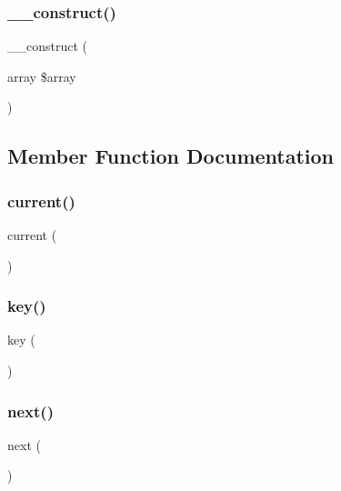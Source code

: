 \subsubsection{\texorpdfstring{\+\_\+\+\_\+construct()}{\_\_construct()}}
{\footnotesize\ttfamily \+\_\+\+\_\+construct (\begin{DoxyParamCaption}\item[{array}]{\$array }\end{DoxyParamCaption})}



\subsection{Member Function Documentation}
\mbox{\label{class_test_iterator2_af343507d1926e6ecf964625d41db528c}} 
\subsubsection{\texorpdfstring{current()}{current()}}
{\footnotesize\ttfamily current (\begin{DoxyParamCaption}{ }\end{DoxyParamCaption})}

\mbox{\label{class_test_iterator2_a729e946b4ef600e71740113c6d4332c0}} 
\subsubsection{\texorpdfstring{key()}{key()}}
{\footnotesize\ttfamily key (\begin{DoxyParamCaption}{ }\end{DoxyParamCaption})}

\mbox{\label{class_test_iterator2_acea62048bfee7b3cd80ed446c86fb78a}} 
\subsubsection{\texorpdfstring{next()}{next()}}
{\footnotesize\ttfamily next (\begin{DoxyParamCaption}{ }\end{DoxyParamCaption})}


